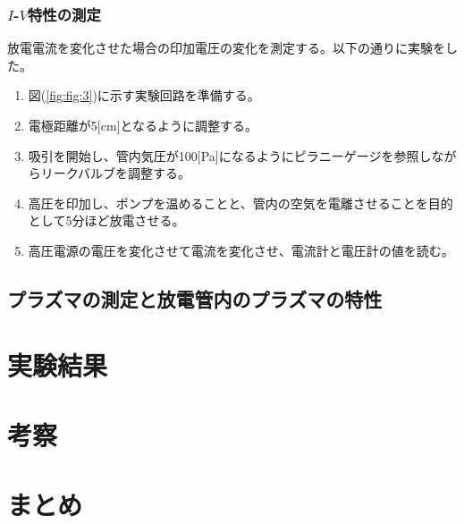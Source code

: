 \documentclass[dvipdfmx]{jsarticle}
\newcommand{\figlab}[1]{図(\ref{fig:#1})}%
\begin{document}
        \subsubsection*{$I$-$V$特性の測定}
            放電電流を変化させた場合の印加電圧の変化を測定する。以下の通りに実験をした。
            \begin{enumerate}[label=\textbf{(\arabic*)}]
            \item \figlab{fig:3}に示す実験回路を準備する。
            \item 電極距離が5[cm]となるように調整する。
            \item 吸引を開始し、管内気圧が100[Pa]になるようにピラニーゲージを参照しながらリークバルブを調整する。
            \item 高圧を印加し、ポンプを温めることと、管内の空気を電離させることを目的として5分ほど放電させる。
            \item 高圧電源の電圧を変化させて電流を変化させ、電流計と電圧計の値を読む。
            \end{enumerate}
            

    \subsection{プラズマの測定と放電管内のプラズマの特性}

\section{実験結果}
\section{考察}
\section{まとめ}



% 
%  
\end{document}
